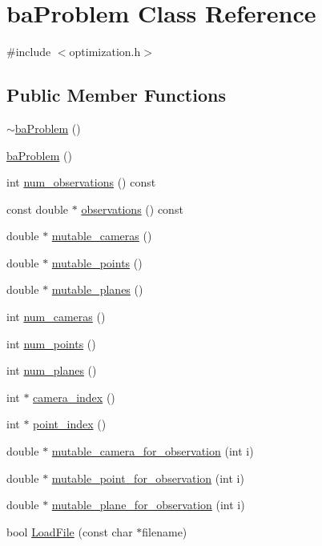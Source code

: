 \hypertarget{classbaProblem}{\section{ba\-Problem Class Reference}
\label{d0/d13/classbaProblem}
}


{\ttfamily \#include $<$optimization.\-h$>$}

\subsection*{Public Member Functions}
\begin{DoxyCompactItemize}
\item 
\hyperlink{classbaProblem_a8fc465a9e9245a125ae6867881428811}{$\sim$ba\-Problem} ()
\item 
\hyperlink{classbaProblem_a136c4774fdef2faa4db80df3fa1c314f}{ba\-Problem} ()
\item 
int \hyperlink{classbaProblem_a7c58929484cf2b00ed3549d9bf344ecc}{num\-\_\-observations} () const 
\item 
const double $\ast$ \hyperlink{classbaProblem_a3cdc19362c8fca6eda57757da2041062}{observations} () const 
\item 
double $\ast$ \hyperlink{classbaProblem_ac85772625fb48c5c8ee6c16e91cf104d}{mutable\-\_\-cameras} ()
\item 
double $\ast$ \hyperlink{classbaProblem_ac1010047fee15558fddfeadd2cecf27d}{mutable\-\_\-points} ()
\item 
double $\ast$ \hyperlink{classbaProblem_adb7fdfcbd20d9f008bc6396bae264a70}{mutable\-\_\-planes} ()
\item 
int \hyperlink{classbaProblem_ae22aaf7bf698f0a0feea98f870fd9208}{num\-\_\-cameras} ()
\item 
int \hyperlink{classbaProblem_a9e5a516d78d2f91ac47cc9aa7a805f57}{num\-\_\-points} ()
\item 
int \hyperlink{classbaProblem_a519b1cf504b357a558d20324331e2d2b}{num\-\_\-planes} ()
\item 
int $\ast$ \hyperlink{classbaProblem_a77c73af5dc63e58f9dcb1d6879e21e2c}{camera\-\_\-index} ()
\item 
int $\ast$ \hyperlink{classbaProblem_a0dfa9d310b92564faee6c5a98a555f17}{point\-\_\-index} ()
\item 
double $\ast$ \hyperlink{classbaProblem_ae072d06b4cb8d1ff880b5f8ee97667e5}{mutable\-\_\-camera\-\_\-for\-\_\-observation} (int i)
\item 
double $\ast$ \hyperlink{classbaProblem_a6ef11eeda5c963bea9afeb2bf22b503a}{mutable\-\_\-point\-\_\-for\-\_\-observation} (int i)
\item 
double $\ast$ \hyperlink{classbaProblem_ae4efd07e572bd96065b3a31981eaf3db}{mutable\-\_\-plane\-\_\-for\-\_\-observation} (int i)
\item 
bool \hyperlink{classbaProblem_afaf36ca131fac1f80dbb5d077d92356c}{Load\-File} (const char $\ast$filename)
\end{DoxyCompactItemize}
